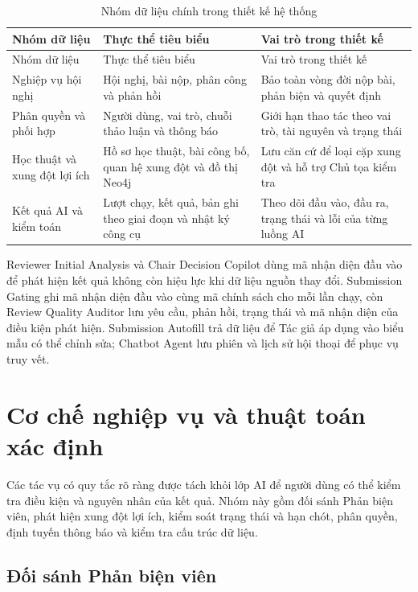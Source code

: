 \begingroup
\setlength{\tabcolsep}{2pt}
\begin{longtable}{|T{0.24\textwidth}|T{0.30\textwidth}|T{0.34\textwidth}|}
\caption{Nhóm dữ liệu chính trong thiết kế hệ thống}\label{tab:ch3-demo-data-groups}\\
\hline
Nhóm dữ liệu & Thực thể tiêu biểu & Vai trò trong thiết kế \\ \hline
\endfirsthead
\hline
Nhóm dữ liệu & Thực thể tiêu biểu & Vai trò trong thiết kế \\ \hline
\endhead
Nghiệp vụ hội nghị & Hội nghị, bài nộp, phân công và phản hồi & Bảo toàn vòng đời nộp bài, phản biện và quyết định \\ \hline
Phân quyền và phối hợp & Người dùng, vai trò, chuỗi thảo luận và thông báo & Giới hạn thao tác theo vai trò, tài nguyên và trạng thái \\ \hline
Học thuật và xung đột lợi ích & Hồ sơ học thuật, bài công bố, quan hệ xung đột và đồ thị Neo4j & Lưu căn cứ để loại cặp xung đột và hỗ trợ Chủ tọa kiểm tra \\ \hline
Kết quả AI và kiểm toán & Lượt chạy, kết quả, bản ghi theo giai đoạn và nhật ký công cụ & Theo dõi đầu vào, đầu ra, trạng thái và lỗi của từng luồng AI \\ \hline
\end{longtable}
\endgroup

Reviewer Initial Analysis và Chair Decision Copilot dùng mã nhận diện đầu vào để phát hiện kết quả không còn hiệu lực khi dữ liệu nguồn thay đổi. Submission Gating ghi mã nhận diện đầu vào cùng mã chính sách cho mỗi lần chạy, còn Review Quality Auditor lưu yêu cầu, phản hồi, trạng thái và mã nhận diện của điều kiện phát hiện. Submission Autofill trả dữ liệu để Tác giả áp dụng vào biểu mẫu có thể chỉnh sửa; Chatbot Agent lưu phiên và lịch sử hội thoại để phục vụ truy vết.

\section{Cơ chế nghiệp vụ và thuật toán xác định}
\label{sec:ch3-demo-deterministic}

Các tác vụ có quy tắc rõ ràng được tách khỏi lớp AI để người dùng có thể kiểm tra điều kiện và nguyên nhân của kết quả. Nhóm này gồm đối sánh Phản biện viên, phát hiện xung đột lợi ích, kiểm soát trạng thái và hạn chót, phân quyền, định tuyến thông báo và kiểm tra cấu trúc dữ liệu.

\subsection{Đối sánh Phản biện viên}

